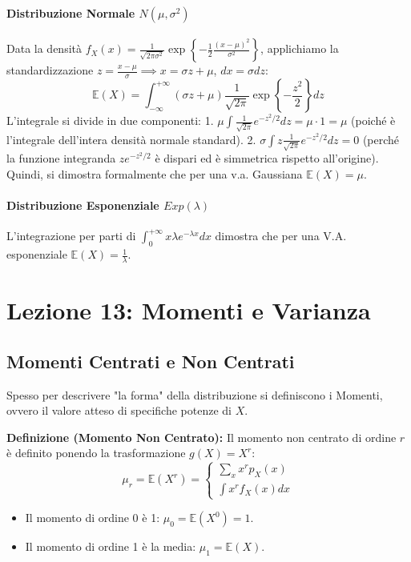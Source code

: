 \documentclass[12pt, a4paper]{article}
\begin{document}
\paragraph{Distribuzione Normale $N(\mu, \sigma^2)$}
Data la densità $f_X(x) = \frac{1}{\sqrt{2\pi\sigma^2}} \exp\left\{-\frac{1}{2}\frac{(x-\mu)^2}{\sigma^2}\right\}$, applichiamo la standardizzazione $z = \frac{x-\mu}{\sigma} \implies x = \sigma z + \mu$, $dx = \sigma dz$:
$$ \mathbb{E}(X) = \int_{-\infty}^{+\infty} (\sigma z + \mu) \frac{1}{\sqrt{2\pi}} \exp\left\{-\frac{z^2}{2}\right\} dz $$
L'integrale si divide in due componenti:
1. $\mu \int \frac{1}{\sqrt{2\pi}} e^{-z^2/2} dz = \mu \cdot 1 = \mu$ (poiché è l'integrale dell'intera densità normale standard).
2. $\sigma \int z \frac{1}{\sqrt{2\pi}} e^{-z^2/2} dz = 0$ (perché la funzione integranda $z e^{-z^2/2}$ è dispari ed è simmetrica rispetto all'origine).
Quindi, si dimostra formalmente che per una v.a. Gaussiana $\mathbb{E}(X) = \mu$.

\paragraph{Distribuzione Esponenziale $Exp(\lambda)$}
L'integrazione per parti di $\int_0^{+\infty} x \lambda e^{-\lambda x} dx$ dimostra che per una V.A. esponenziale $\mathbb{E}(X) = \frac{1}{\lambda}$.


\section{Lezione 13: Momenti e Varianza}

\subsection{Momenti Centrati e Non Centrati}
Spesso per descrivere "la forma" della distribuzione si definiscono i Momenti, ovvero il valore atteso di specifiche potenze di $X$.

\textbf{Definizione (Momento Non Centrato):} Il momento non centrato di ordine $r$ è definito ponendo la trasformazione $g(X) = X^r$:
$$ \mu_r = \mathbb{E}(X^r) = \begin{cases} \sum_x x^r p_X(x) \\ \int x^r f_X(x) dx \end{cases} $$
\begin{itemize}
    \item Il momento di ordine 0 è 1: $\mu_0 = \mathbb{E}(X^0) = 1$.
    \item Il momento di ordine 1 è la media: $\mu_1 = \mathbb{E}(X)$.
\end{itemize}
\end{document}
